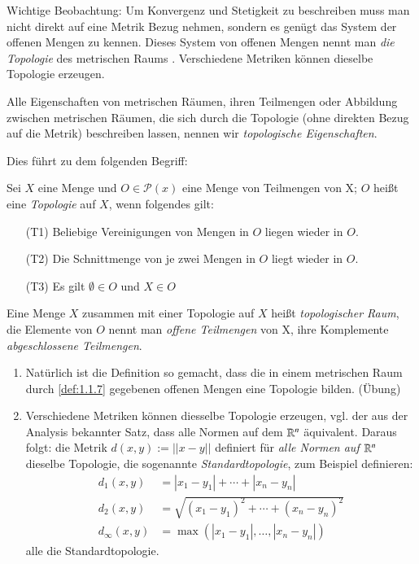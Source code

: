 \documentclass[a4paper,10pt]{scrartcl}
\begin{document}
Wichtige Beobachtung: Um Konvergenz und Stetigkeit zu beschreiben muss man nicht direkt auf eine Metrik Bezug nehmen, sondern es genügt das System der offenen Mengen zu kennen.  Dieses System von offenen Mengen nennt man \emph{die Topologie} des metrischen Raums .  Verschiedene Metriken können dieselbe Topologie erzeugen.

Alle Eigenschaften von metrischen Räumen, ihren Teilmengen oder Abbildung zwischen metrischen Räumen, die sich durch die Topologie (ohne direkten Bezug auf die Metrik) beschreiben lassen, nennen wir \emph{topologische Eigenschaften}.

Dies führt zu dem folgenden Begriff:
\begin{df}
Sei $ X $ eine Menge und $O \in \mathcal P (x)$ eine Menge von Teilmengen von X; $ O $ heißt eine \emph{Topologie} auf $ X $, wenn folgendes gilt:
\begin{itemize}
\item[(T1)] Beliebige Vereinigungen von Mengen in $ O $ liegen wieder in $O$.
\item[(T2)] Die Schnittmenge von je zwei Mengen in $  O  $ liegt wieder in $O$.
\item[(T3)] Es gilt $ \emptyset \in O $ und $ X \in O$
\end{itemize}
Eine Menge $ X $ zusammen mit einer Topologie auf $ X $ heißt \emph{topologischer Raum}, die Elemente von $ O $ nennt man \emph{offene Teilmengen} von X, ihre Komplemente \emph{abgeschlossene Teilmengen}.
\end{df}
\begin{note*}
\begin{enumerate}
\item Natürlich ist die Definition so gemacht, dass die in einem metrischen Raum durch \ref{def:1.1.7} gegebenen offenen Mengen eine Topologie bilden. (Übung) 
\begin{figure}[H]
\centering
\fixme[fig5]
\caption{}
\end{figure}
\item Verschiedene Metriken können diesselbe Topologie erzeugen, vgl. der aus der Analysis bekannter Satz, dass alle Normen auf dem $ \mathbb{R}^n $ äquivalent.
  Daraus folgt: die Metrik $ d(x,y) :=||x-y|| $ definiert für \emph{alle Normen auf $ \mathbb{R}^n $} dieselbe Topologie, die sogenannte \emph{Standardtopologie}, zum Beispiel definieren:
\begin{align*}
d_1(x,y)&=|x_1-y_1|+\dotsb +|x_n-y_n|\\
d_2(x,y)&=\sqrt{(x_1-y_1)^2+\dotsb +(x_n-y_n)^2}\\
d_\infty(x,y)&=\max(|x_1-y_1|, \dotsc  , |x_n-y_n|)
\end{align*}
alle die Standardtopologie.
\end{enumerate}
\end{note*}
\end{document}
